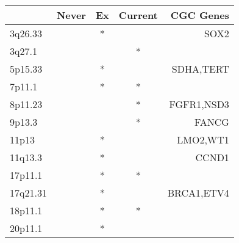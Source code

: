 \begin{tabular}{lcccr}
\toprule
{} & Never & Ex & Current &   CGC Genes \\
\midrule
3q26.33  &       &  * &         &        SOX2 \\
3q27.1   &       &    &       * &             \\
5p15.33  &       &  * &         &   SDHA,TERT \\
7p11.1   &       &  * &       * &             \\
8p11.23  &       &    &       * &  FGFR1,NSD3 \\
9p13.3   &       &    &       * &       FANCG \\
11p13    &       &  * &         &    LMO2,WT1 \\
11q13.3  &       &  * &         &       CCND1 \\
17p11.1  &       &  * &       * &             \\
17q21.31 &       &  * &         &  BRCA1,ETV4 \\
18p11.1  &       &  * &       * &             \\
20p11.1  &       &  * &         &             \\
\bottomrule
\end{tabular}
